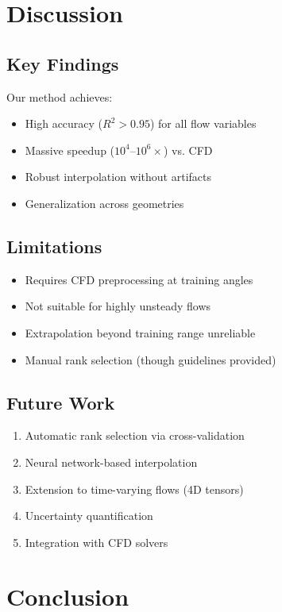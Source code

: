 \documentclass[conference]{IEEEtran}
\begin{document}
\section{Discussion}

\subsection{Key Findings}

Our method achieves:
\begin{itemize}
    \item High accuracy ($R^2 > 0.95$) for all flow variables
    \item Massive speedup ($10^4$--$10^6\times$) vs. CFD
    \item Robust interpolation without artifacts
    \item Generalization across geometries
\end{itemize}

\subsection{Limitations}

\begin{itemize}
    \item Requires CFD preprocessing at training angles
    \item Not suitable for highly unsteady flows
    \item Extrapolation beyond training range unreliable
    \item Manual rank selection (though guidelines provided)
\end{itemize}

\subsection{Future Work}

\begin{enumerate}
    \item Automatic rank selection via cross-validation
    \item Neural network-based interpolation
    \item Extension to time-varying flows (4D tensors)
    \item Uncertainty quantification
    \item Integration with CFD solvers
\end{enumerate}

\section{Conclusion}
\end{document}
